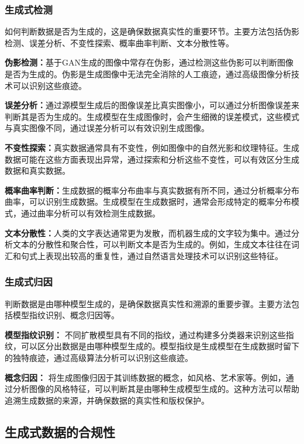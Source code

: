 \documentclass[a4paper]{nuist}
\begin{document}
\subsubsection{生成式检测}

如何判断数据是否为生成的，这是确保数据真实性的重要环节。主要方法包括伪影检测、误差分析、不变性探索、概率曲率判断、文本分散性等。

\textbf{伪影检测：}基于GAN生成的图像中常存在伪影，通过检测这些伪影可以判断图像是否为生成的。伪影是生成图像中无法完全消除的人工痕迹，通过高级图像分析技术可以识别这些痕迹。

\textbf{误差分析：}通过源模型生成后的图像误差比真实图像小，可以通过分析图像误差来判断其是否为生成的。生成模型在生成图像时，会产生细微的误差模式，这些模式与真实图像不同，通过误差分析可以有效识别生成图像。

\textbf{不变性探索：}真实数据通常具有不变性，例如图像中的自然光影和纹理特征。生成数据可能在这些方面表现出异常，通过探索和分析这些不变性，可以有效区分生成数据和真实数据。

\textbf{概率曲率判断：}生成数据的概率分布曲率与真实数据有所不同，通过分析概率分布曲率，可以识别生成数据。生成模型在生成数据时，通常会形成特定的概率分布模式，通过曲率分析可以有效检测生成数据。

\textbf{文本分散性：}人类的文字表达通常更为发散，而机器生成的文字较为集中。通过分析文本的分散性和聚合性，可以判断文本是否为生成的。例如，生成文本往往在词汇和句式上表现出较高的重复性，通过自然语言处理技术可以识别这些特征。


\subsubsection{生成式归因}

判断数据是由哪种模型生成的，是确保数据真实性和溯源的重要步骤。主要方法包括模型指纹识别、概念归因等。

\textbf{模型指纹识别：}
不同扩散模型具有不同的指纹，通过构建多分类器来识别这些指纹，可以区分出数据是由哪种模型生成的。模型指纹是生成模型在生成数据时留下的独特痕迹，通过高级算法分析可以识别这些痕迹。


\textbf{概念归因：}
将生成图像归因于其训练数据的概念，如风格、艺术家等。例如，通过分析图像的风格特征，可以判断其是由哪种生成模型生成的。这种方法可以帮助追溯生成数据的来源，并确保数据的真实性和版权保护。

\subsection{生成式数据的合规性}
\end{document}
